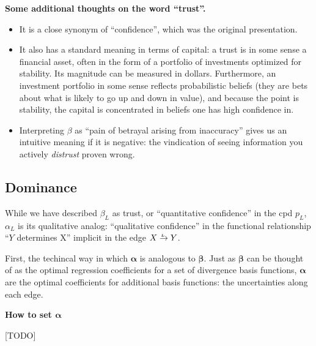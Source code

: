 \documentclass[twoside]{article} %
\theoremstyle{plain}
\theoremstyle{definition}
\newcommand{\balpha}{\boldsymbol\alpha}
\newcommand{\bbeta}{\boldsymbol\beta}
\newcommand{\ed}[3]{#2%
    	  \overset{\smash{\mskip-5mu\raisebox{-1pt}{$\scriptscriptstyle
    	        #1$}}}{\rightarrow} #3}
\begin{document}
    \textbf{Some additional thoughts on the word ``trust''.}
    \begin{itemize}
        \item It is a close synonym of ``confidence'', which was the original presentation.

        \item It also has a standard meaning in terms of capital: a trust is in some sense a financial asset, often in the form of a portfolio of investments optimized for stability. Its magnitude can be measured in dollars.
        Furthermore, an investment portfolio in some sense reflects probabilistic beliefs (they are bets about what is likely to go up and down in value), and because the point is stability, the capital is concentrated in beliefs one has high confidence in.

        \item Interpreting $\beta$ as ``pain of betrayal arising from inaccuracy'' gives us an intuitive meaning if it is negative: the vindication of seeing information you actively \emph{distrust} proven wrong.
    \end{itemize}





    \subsection{Dominance}
    While we have described $\beta_L$ as trust, or ``quantitative confidence'' in the cpd $p_L$,
    $\alpha_L$ is its qualitative analog: ``qualitative confidence'' in the functional relationship ``$Y$ determines X'' implicit in the edge $\ed LXY$.

    First, the techincal way in which $\balpha$ is analogous to $\bbeta$.
    Just as $\bbeta$ can be thought of as the optimal regression coefficients for a set of divergence basis functions, $\balpha$ are the optimal coefficients for additional basis functions: the uncertainties along each edge.


    \textbf{How to set $\balpha$}

    [TODO]

    \begin{center}
    \end{center}
\end{document}
